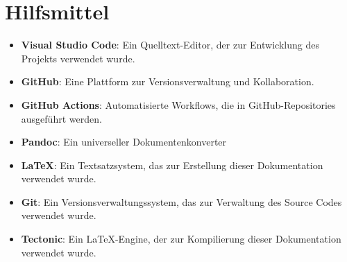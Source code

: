 \section*{Hilfsmittel}
\begin{itemize}
    \item \textbf{Visual Studio Code}: Ein Quelltext-Editor, der zur Entwicklung des Projekts verwendet wurde.
    \item \textbf{GitHub}: Eine Plattform zur Versionsverwaltung und Kollaboration.
    \item \textbf{GitHub Actions}: Automatisierte Workflows, die in GitHub-Repositories ausgeführt werden.
    \item \textbf{Pandoc}: Ein universeller Dokumentenkonverter
    \item \textbf{LaTeX}: Ein Textsatzsystem, das zur Erstellung dieser Dokumentation verwendet wurde.
    \item \textbf{Git}: Ein Versionsverwaltungssystem, das zur Verwaltung des Source Codes verwendet wurde.
    \item \textbf{Tectonic}: Ein LaTeX-Engine, der zur Kompilierung dieser Dokumentation verwendet wurde.
\end{itemize}